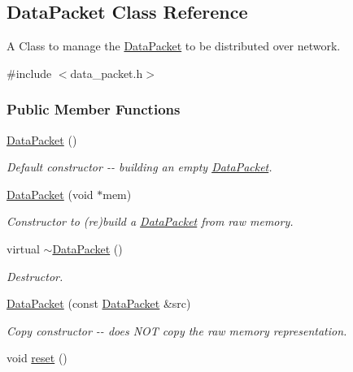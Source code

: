 \hypertarget{class_data_packet}{
\subsection{DataPacket Class Reference}
\label{class_data_packet}
}


A Class to manage the \hyperlink{class_data_packet}{DataPacket} to be distributed over network.  


{\ttfamily \#include $<$data\_\-packet.h$>$}\subsubsection*{Public Member Functions}
\begin{DoxyCompactItemize}
\item 
\hypertarget{class_data_packet_a2790f5d5d053c3cd4e15792c6a57bed9}{
\hyperlink{class_data_packet_a2790f5d5d053c3cd4e15792c6a57bed9}{DataPacket} ()}
\label{class_data_packet_a2790f5d5d053c3cd4e15792c6a57bed9}

\begin{DoxyCompactList}\small\item\em Default constructor -\/-\/ building an empty \hyperlink{class_data_packet}{DataPacket}. \item\end{DoxyCompactList}\item 
\hyperlink{class_data_packet_abcb0afec0bf5e6c21175f25d7911b1d7}{DataPacket} (void $\ast$mem)
\begin{DoxyCompactList}\small\item\em Constructor to (re)build a \hyperlink{class_data_packet}{DataPacket} from raw memory. \item\end{DoxyCompactList}\item 
virtual \hyperlink{class_data_packet_a6865aaea072c8af4caf7e4cb6baa0155}{$\sim$DataPacket} ()
\begin{DoxyCompactList}\small\item\em Destructor. \item\end{DoxyCompactList}\item 
\hyperlink{class_data_packet_a0419e5f0113aad80d8c92f59bf990c26}{DataPacket} (const \hyperlink{class_data_packet}{DataPacket} \&src)
\begin{DoxyCompactList}\small\item\em Copy constructor -\/-\/ does NOT copy the raw memory representation. \item\end{DoxyCompactList}\item 
\hypertarget{class_data_packet_a36f3ab573fdeff022c6a5742795fc552}{
void \hyperlink{class_data_packet_a36f3ab573fdeff022c6a5742795fc552}{reset} ()}
\label{class_data_packet_a36f3ab573fdeff022c6a5742795fc552}


\end{DoxyCompactItemize}

